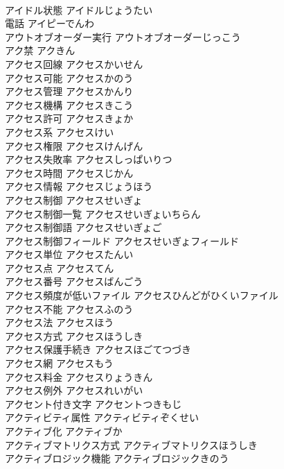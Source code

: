\documentclass[8pt]{extreport}
\begin{document}
\begin{CJK}{UTF8}{min}
\\	アイドル状態	アイドルじょうたい	
\\	電話	アイピーでんわ	
\\	アウトオブオーダー実行	アウトオブオーダーじっこう	
\\	アク禁	アクきん	
\\	アクセス回線	アクセスかいせん	
\\	アクセス可能	アクセスかのう	
\\	アクセス管理	アクセスかんり	
\\	アクセス機構	アクセスきこう	
\\	アクセス許可	アクセスきょか	
\\	アクセス系	アクセスけい	
\\	アクセス権限	アクセスけんげん	
\\	アクセス失敗率	アクセスしっぱいりつ	
\\	アクセス時間	アクセスじかん	
\\	アクセス情報	アクセスじょうほう	
\\	アクセス制御	アクセスせいぎょ	
\\	アクセス制御一覧	アクセスせいぎょいちらん	
\\	アクセス制御語	アクセスせいぎょご	
\\	アクセス制御フィールド	アクセスせいぎょフィールド	
\\	アクセス単位	アクセスたんい	
\\	アクセス点	アクセスてん	
\\	アクセス番号	アクセスばんごう	
\\	アクセス頻度が低いファイル	アクセスひんどがひくいファイル	
\\	アクセス不能	アクセスふのう	
\\	アクセス法	アクセスほう	
\\	アクセス方式	アクセスほうしき	
\\	アクセス保護手続き	アクセスほごてつづき	
\\	アクセス網	アクセスもう	
\\	アクセス料金	アクセスりょうきん	
\\	アクセス例外	アクセスれいがい	
\\	アクセント付き文字	アクセントつきもじ	
\\	アクティビティ属性	アクティビティぞくせい	
\\	アクティブ化	アクティブか	
\\	アクティブマトリクス方式	アクティブマトリクスほうしき	
\\	アクティブロジック機能	アクティブロジックきのう	

\end{CJK}
\end{document}
